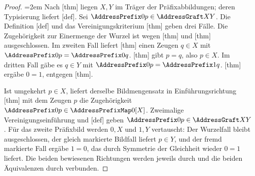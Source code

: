 \begin{proof}
\emergencystretch=2em
Nach [thm]
liegen \(X,Y\) im Träger der Präfixabbildungen; deren Typisierung
liefert [def].
Sei \(\AddressPrefix0p\in\AddressGraft X Y\). Die Definition
[def] und das Vereinigungskriterium
[thm]
geben drei Fälle. Die Zugehörigkeit zur Einermenge der Wurzel ist
wegen [thm] und
[thm] ausgeschlossen.
Im zweiten Fall liefert
[thm]
einen Zeugen \(q\in X\) mit \(\AddressPrefix0p=\AddressPrefix0q\).
[thm] gibt \(p=q\),
also \(p\in X\). Im dritten Fall gäbe es \(q\in Y\) mit
\(\AddressPrefix0p=\AddressPrefix1q\).
[thm] ergäbe
\(0=1\), entgegen [thm].

Ist umgekehrt \(p\in X\), liefert derselbe Bildmengensatz in
Einführungsrichtung
[thm]
mit dem Zeugen \(p\) die Zugehörigkeit
\(\AddressPrefix0p\in\AddressPrefixMap0[X]\).
Zweimalige Vereinigungseinführung und
[def] geben
\(\AddressPrefix0p\in\AddressGraft X Y\).
Für das zweite Präfixbild werden \(0,X\) und \(1,Y\) vertauscht:
Der Wurzelfall bleibt ausgeschlossen, der gleich markierte Bildfall
liefert \(p\in Y\), und der fremd markierte Fall ergäbe \(1=0\),
das durch Symmetrie der Gleichheit wieder \(0=1\) liefert.
Die beiden bewiesenen Richtungen werden jeweils durch \rLRI{} und
die beiden Äquivalenzen durch \rAI{} verbunden.
\end{proof}

